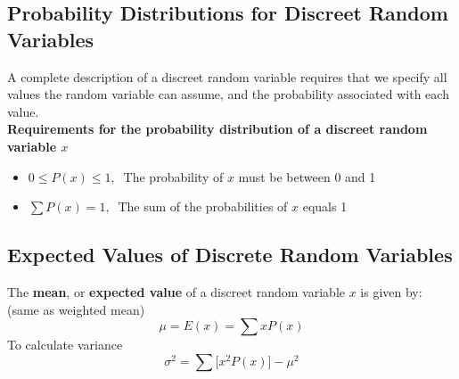 \documentclass[a4paper]{article}
\let\bf\textbf
\begin{document}
\subsection{Probability Distributions for Discreet Random Variables}
A complete description of a discreet random variable requires that we specify all values the random variable can assume, and the probability associated with each value.
\vspace{3mm}\\
\bf{Requirements for the probability distribution of a discreet random variable $x$}
\begin{itemize}
    \item $0 \leq P(x) \leq 1,\ $ The probability of $x$ must be between 0 and 1
    \item $\sum P(x) = 1,\ $ The sum of the probabilities of $x$ equals 1
\end{itemize}
\subsection{Expected Values of Discrete Random Variables}
The \bf{mean}, or \bf{expected value} of a discreet random variable $x$ is given by: \hspace{15mm} (same as weighted mean)
\begin{equation}
    \mu = E(x) = \sum x P(x)
\end{equation}
To calculate variance 
\begin{equation}
    \sigma^2 = \sum \big[x^2 P(x)\big] - \mu^2
\end{equation}
\end{document}
